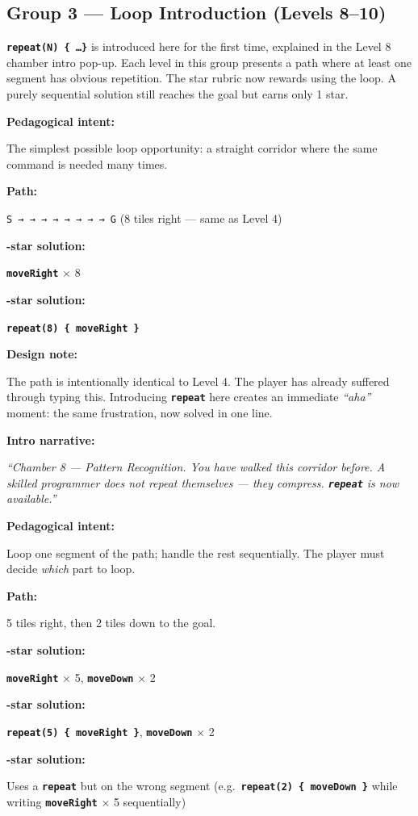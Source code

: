 \documentclass[12pt,a4paper]{article}
\newcommand{\keyword}[1]{\textcolor{keyword}{\texttt{\bfseries #1}}}
\newcommand{\gddfield}[2]{%
  \noindent\begin{minipage}[t]{3.5cm}\bfseries\color{accent}\sffamily#1\end{minipage}%
  \hspace{8pt}%
  \begin{minipage}[t]{\dimexpr\linewidth-3.5cm-8pt\relax}%
    #2
  \end{minipage}\par\smallskip}
\begin{document}
\subsection{Group 3 — Loop Introduction (Levels 8--10)}

\begin{tcolorbox}[gddbox, title={Group Design Note}]
\keyword{repeat(N) \{ \ldots \}} is introduced here for the first time, explained in the Level 8 chamber intro pop-up. Each level in this group presents a path where at least one segment has obvious repetition. The star rubric now rewards using the loop. A purely sequential solution still reaches the goal but earns only 1 star.
\end{tcolorbox}

\begin{tcolorbox}[gddbox, title={Level 8 — Repeat Corridor}]
\gddfield{Pedagogical intent:}{The simplest possible loop opportunity: a straight corridor where the same command is needed many times.}
\gddfield{Path:}{\texttt{S → → → → → → → → G} (8 tiles right — same as Level 4)}
\gddfield{1-star solution:}{\keyword{moveRight} $\times$ 8}
\gddfield{3-star solution:}{\keyword{repeat(8) \{ moveRight \}}}
\gddfield{Design note:}{The path is intentionally identical to Level 4. The player has already suffered through typing this. Introducing \keyword{repeat} here creates an immediate \emph{``aha''} moment: the same frustration, now solved in one line.}
\gddfield{Intro narrative:}{\emph{``Chamber 8 — Pattern Recognition. You have walked this corridor before. A skilled programmer does not repeat themselves — they compress. \keyword{repeat} is now available.''}}
\end{tcolorbox}

\begin{tcolorbox}[gddbox, title={Level 9 — Step and Repeat}]
\gddfield{Pedagogical intent:}{Loop one segment of the path; handle the rest sequentially. The player must decide \emph{which} part to loop.}
\gddfield{Path:}{5 tiles right, then 2 tiles down to the goal.}
\gddfield{1-star solution:}{\keyword{moveRight} $\times$ 5, \keyword{moveDown} $\times$ 2}
\gddfield{3-star solution:}{\keyword{repeat(5) \{ moveRight \}}, \keyword{moveDown} $\times$ 2}
\gddfield{2-star solution:}{Uses a \keyword{repeat} but on the wrong segment (e.g.\ \keyword{repeat(2) \{ moveDown \}} while writing \keyword{moveRight} $\times$ 5 sequentially)}
\end{tcolorbox}
\end{document}
